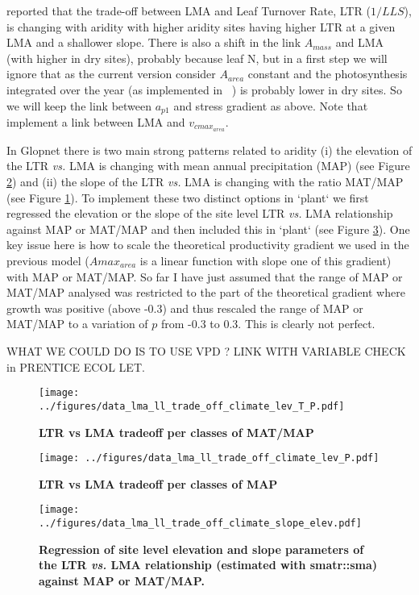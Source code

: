 \documentclass[a4paper,11pt]{article}
\begin{document}
\citet{Wright-2005} reported that the trade-off between LMA and Leaf Turnover Rate, LTR ($1/LLS$), is changing with aridity with higher aridity sites having higher LTR at a given LMA and a shallower slope. There is also a shift in the link $A_{mass}$ and LMA (with higher in dry sites), probably because leaf N, but in a first step we will ignore that as the current version consider $A_{area}$ constant and the photosynthesis integrated over the year (as implemented in \plant\ ) is probably lower in dry sites. So we will keep the link between $a_{p1}$ and stress gradient as above. Note that \citet{Sakschewski-2015} implement a link between LMA and $v_{cmax_{area}}$.

In Glopnet there is two main strong patterns related to aridity (i) the elevation of the LTR \textit{vs.} LMA is changing with mean annual precipitation (MAP) (see Figure \ref{fig:MAP}) and (ii) the slope of the LTR \textit{vs.} LMA is changing with the ratio MAT/MAP (see Figure \ref{fig:MAT_MAP}). To implement these two distinct options in `plant` we first regressed the elevation or the slope of the site level LTR \textit{vs.} LMA relationship against MAP or MAT/MAP and then included this in `plant` (see Figure \ref{fig:elev_slope}). One key issue here is how to scale the theoretical productivity gradient we used in the previous model ($A{max}_{area}$ is a linear function with slope one of this gradient) with MAP or MAT/MAP. So far I have just assumed that the range of MAP or MAT/MAP analysed was restricted to the part of the theoretical gradient where growth was positive (above -0.3) and thus rescaled the range of MAP or MAT/MAP to a variation of $p$ from -0.3 to 0.3. This is clearly not perfect.

WHAT WE COULD DO IS TO USE VPD ? LINK WITH VARIABLE CHECK in PRENTICE ECOL LET.

\begin{figure}[ht]
\centering
\texttt{[image: ../figures/data\_lma\_ll\_trade\_off\_climate\_lev\_T\_P.pdf]}
\caption{\textbf{LTR vs LMA tradeoff per classes of MAT/MAP}
\label{fig:MAT_MAP}}
\end{figure}


\begin{figure}[ht]
\centering
\texttt{[image: ../figures/data\_lma\_ll\_trade\_off\_climate\_lev\_P.pdf]}
\caption{\textbf{LTR vs LMA tradeoff per classes of MAP}
\label{fig:MAP}}
\end{figure}

\begin{figure}[ht]
\centering
\texttt{[image: ../figures/data\_lma\_ll\_trade\_off\_climate\_slope\_elev.pdf]}
\caption{\textbf{Regression of site level elevation and slope parameters of the LTR \textit{vs.} LMA relationship (estimated with smatr::sma) against MAP or MAT/MAP. }
\label{fig:elev_slope}}
\end{figure}
\end{document}
